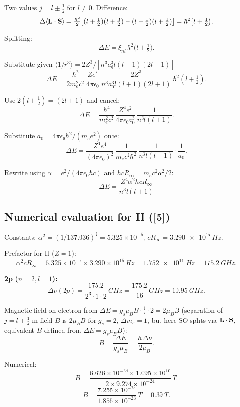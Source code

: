 \documentclass[11pt]{article}
\begin{document}
Two values $j=l\pm\tfrac12$ for $l\neq 0$. Difference:
\[
\Delta\langle\vb L\cdot\vb S\rangle = \tfrac{\hbar^2}{2}\bigl[(l+\tfrac12)(l+\tfrac32)-(l-\tfrac12)(l+\tfrac12)\bigr] = \hbar^2\bigl(l+\tfrac12\bigr).
\]

Splitting:
\[
\Delta E = \xi_{nl}\,\hbar^2\bigl(l+\tfrac12\bigr).
\]

Substitute given $\langle 1/r^3\rangle = 2 Z^3 / [n^3 a_0^3 l(l+1)(2l+1)]$:
\[
\Delta E = \frac{\hbar^2}{2 m_e^2 c^2}\,\frac{Ze^2}{4\pi\epsilon_0}\,\frac{2 Z^3}{n^3 a_0^3 l(l+1)(2l+1)}\,\hbar^2(l+\tfrac12).
\]

Use $2(l+\tfrac12) = (2l+1)$ and cancel:
\[
\Delta E = \frac{\hbar^4}{m_e^2 c^2}\,\frac{Z^4 e^2}{4\pi\epsilon_0 a_0^3}\,\frac{1}{n^3 l(l+1)}.
\]

Substitute $a_0 = 4\pi\epsilon_0\hbar^2/(m_e e^2)$ once:
\[
\Delta E = \frac{Z^4 e^4}{(4\pi\epsilon_0)^2}\,\frac{1}{m_e c^2 \hbar^2}\,\frac{1}{n^3 l(l+1)} \cdot \frac{1}{a_0}.
\]

Rewrite using $\alpha = e^2/(4\pi\epsilon_0\hbar c)$ and $hcR_\infty = m_e c^2\alpha^2/2$:
\begin{equation}
\boxed{\;\Delta E = \frac{Z^4 \alpha^2 hc R_\infty}{n^3 l(l+1)}\;}
\label{eq:fs-result}
\end{equation}

\subsection*{Numerical evaluation for H ([5])}

Constants: $\alpha^2 = (1/137.036)^2 = 5.325\times 10^{-5}$, $cR_\infty = \SI{3.290e15}{Hz}$.

Prefactor for H ($Z=1$):
\[
\alpha^2 cR_\infty = 5.325\times 10^{-5} \times 3.290\times 10^{15}\,\si{Hz} = \SI{1.752e11}{Hz} = \SI{175.2}{GHz}.
\]

\textbf{2p ($n=2,l=1$):}
\[
\Delta\nu(2p) = \frac{175.2}{2^3\cdot 1\cdot 2}\,\si{GHz} = \frac{175.2}{16}\,\si{GHz} = \boxed{\SI{10.95}{GHz}}.
\]

Magnetic field on electron from $\Delta E = g_s\mu_B B\cdot\tfrac12\cdot 2 = 2\mu_B B$ (separation of $j=l\pm\tfrac12$ in field $B$ is $2\mu_B B$ for $g_s=2$, $\Delta m_s=1$, but here SO splits via $\vb L\cdot\vb S$, equivalent $B$ defined from $\Delta E = g_s\mu_B B$):
\[
B = \frac{\Delta E}{g_s\mu_B} = \frac{h\,\Delta\nu}{2\mu_B}.
\]

Numerical:
\[
B = \frac{6.626\times 10^{-34}\times 1.095\times 10^{10}}{2\times 9.274\times 10^{-24}}\,\si{T}.
\]
\[
B = \frac{7.255\times 10^{-24}}{1.855\times 10^{-23}}\,\si{T} = \boxed{\SI{0.39}{T}}.
\]
\end{document}

